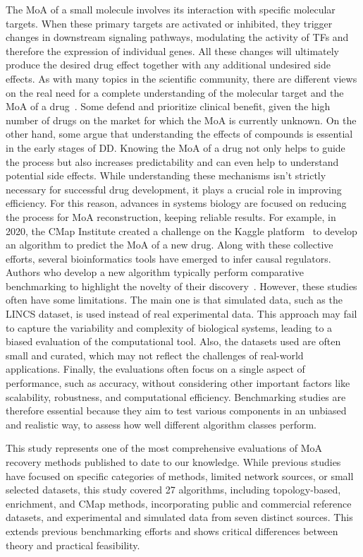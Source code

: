 The \gls{MoA} of a small molecule involves its interaction with specific molecular targets. When these primary targets are activated or inhibited, they trigger changes in downstream signaling pathways, modulating the activity of \gls{TF}s and therefore the expression of individual genes. 
All these changes will ultimately produce the desired drug effect together with any additional undesired side effects. 
As with many topics in the scientific community, there are different views on the real need for a complete understanding of the molecular target and the \gls{MoA} of a drug~\cite{RN112}. 
Some defend and prioritize clinical benefit, given the high number of drugs on the market for which the \gls{MoA} is currently unknown. 
On the other hand, some argue that understanding the effects of compounds is essential in the early stages of \gls{DD}. 
Knowing the \gls{MoA} of a drug not only helps to guide the process but also increases predictability and can even help to understand potential side effects. 
While understanding these mechanisms isn't strictly necessary for successful drug development, it plays a crucial role in improving efficiency. 
For this reason, advances in systems biology are focused on reducing the process for \gls{MoA} reconstruction, keeping reliable results. 
For example, in 2020, the \gls{CMap} Institute created a challenge on the Kaggle platform~\cite{RN162} to develop an algorithm to predict the \gls{MoA} of a new drug. 
Along with these collective efforts, several bioinformatics tools have emerged to infer causal regulators. 
Authors who develop a new algorithm typically perform comparative benchmarking to highlight the novelty of their discovery~\cite{RN109}. 
However, these studies often have some limitations. The main one is that simulated data, such as the \gls{LINCS} dataset, is used instead of real experimental data. 
This approach may fail to capture the variability and complexity of biological systems, leading to a biased evaluation of the computational tool.
Also, the datasets used are often small and curated, which may not reflect the challenges of real-world applications.
Finally, the evaluations often focus on a single aspect of performance, such as accuracy, without considering other important factors like scalability, robustness, and computational efficiency. 
Benchmarking studies are therefore essential because they aim to test various components in an unbiased and realistic way, to assess how well different algorithm classes perform.

This study represents one of the most comprehensive evaluations of \gls{MoA} recovery methods published to date to our knowledge. 
While previous studies have focused on specific categories of methods, limited network sources, or small selected datasets, this study covered 27 algorithms, including topology-based, enrichment, and \gls{CMap} methods, incorporating public and commercial reference datasets, and experimental and simulated data from seven distinct sources. 
This extends previous benchmarking efforts and shows critical differences between theory and practical feasibility.

